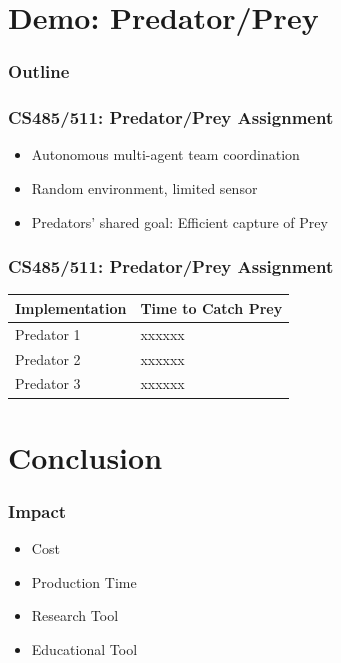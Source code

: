 \documentclass[mathserif,usenames,dvipsnames]{beamer}
\begin{document}
\section{Demo: Predator/Prey}
\frame
{
    \frametitle{Outline}
    \tableofcontents
}

\frame
{
    \frametitle{CS485/511: Predator/Prey Assignment}
    \begin{itemize}
        \item Autonomous multi-agent team coordination
        \item Random environment, limited sensor
        \item Predators' shared goal: Efficient capture of Prey
    \end{itemize}
}

\frame
{
    \frametitle{CS485/511: Predator/Prey Assignment}
    \begin{center}
    \begin{tabular}{|l|l|} \hline
        \textbf{Implementation} & \textbf{Time to Catch Prey} \\ \hline
        Predator 1 & xxxxxx \\ \hline
        Predator 2 & xxxxxx \\ \hline
        Predator 3 & xxxxxx \\ \hline
    \end{tabular}
    \end{center}
}

\section{Conclusion}
\frame
{
    \frametitle{Impact}
    \begin{itemize}
        \item Cost
        \item Production Time
        \item Research Tool
        \item Educational Tool
    \end{itemize}
}
\end{document}
